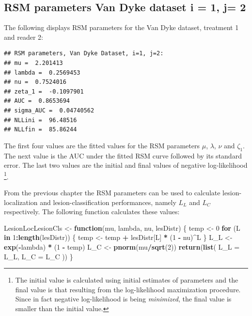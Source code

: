 \documentclass[
]{book}
\newenvironment{Shaded}{\begin{snugshade}}{\end{snugshade}}
\newcommand{\ControlFlowTok}[1]{\textcolor[rgb]{0.13,0.29,0.53}{\textbf{#1}}}
\newcommand{\DataTypeTok}[1]{\textcolor[rgb]{0.13,0.29,0.53}{#1}}
\newcommand{\DecValTok}[1]{\textcolor[rgb]{0.00,0.00,0.81}{#1}}
\newcommand{\KeywordTok}[1]{\textcolor[rgb]{0.13,0.29,0.53}{\textbf{#1}}}
\newcommand{\NormalTok}[1]{#1}
\newcommand{\OperatorTok}[1]{\textcolor[rgb]{0.81,0.36,0.00}{\textbf{#1}}}
\newcommand{\StringTok}[1]{\textcolor[rgb]{0.31,0.60,0.02}{#1}}
\begin{document}
\hypertarget{rsm-parameters-van-dyke-dataset-i-1-j-2}{%
\subsection{RSM parameters Van Dyke dataset i = 1, j= 2}\label{rsm-parameters-van-dyke-dataset-i-1-j-2}}

The following displays RSM parameters for the Van Dyke dataset, treatment 1 and reader 2:

\begin{verbatim}
## RSM parameters, Van Dyke Dataset, i=1, j=2: 
## mu =  2.201413 
## lambda =  0.2569453 
## nu =  0.7524016 
## zeta_1 =  -0.1097901 
## AUC =  0.8653694 
## sigma_AUC =  0.04740562 
## NLLini =  96.48516 
## NLLfin =  85.86244
\end{verbatim}

The first four values are the fitted values for the RSM parameters \(\mu\), \(\lambda\), \(\nu\) and \(\zeta_1\). The next value is the AUC under the fitted RSM curve followed by its standard error. The last two values are the initial and final values of negative log-likelihood \footnote{The initial value is calculated using initial estimates of parameters and the final value is that resulting from the log-likelihood maximization procedure. Since in fact negative log-likelihood is being \emph{minimized}, the final value is smaller than the initial value.}.

From the previous chapter the RSM parameters can be used to calculate lesion-localization and lesion-classification performances, namely \(L_L\) and \(L_C\) respectively. The following function calculates these values:

\begin{Shaded}
\begin{Highlighting}[]
\NormalTok{LesionLocLesionCls <-}\StringTok{ }\ControlFlowTok{function}\NormalTok{(mu, lambda, nu, lesDistr) \{}
\NormalTok{  temp <-}\StringTok{ }\DecValTok{0}
  \ControlFlowTok{for}\NormalTok{ (L }\ControlFlowTok{in} \DecValTok{1}\OperatorTok{:}\KeywordTok{length}\NormalTok{(lesDistr)) \{}
\NormalTok{    temp <-}\StringTok{ }\NormalTok{temp }\OperatorTok{+}\StringTok{ }\NormalTok{lesDistr[L] }\OperatorTok{*}\StringTok{ }\NormalTok{(}\DecValTok{1} \OperatorTok{-}\StringTok{ }\NormalTok{nu)}\OperatorTok{^}\NormalTok{L}
\NormalTok{  \}}
\NormalTok{  L_L <-}\StringTok{ }\KeywordTok{exp}\NormalTok{(}\OperatorTok{-}\NormalTok{lambda) }\OperatorTok{*}\StringTok{ }\NormalTok{(}\DecValTok{1} \OperatorTok{-}\StringTok{ }\NormalTok{temp)}
\NormalTok{  L_C <-}\StringTok{ }\KeywordTok{pnorm}\NormalTok{(mu}\OperatorTok{/}\KeywordTok{sqrt}\NormalTok{(}\DecValTok{2}\NormalTok{))}
  \KeywordTok{return}\NormalTok{(}\KeywordTok{list}\NormalTok{(}
    \DataTypeTok{L_L =}\NormalTok{ L_L,}
    \DataTypeTok{L_C =}\NormalTok{ L_C}
\NormalTok{  ))}
\NormalTok{\}}
\end{Highlighting}
\end{Shaded}
\end{document}
